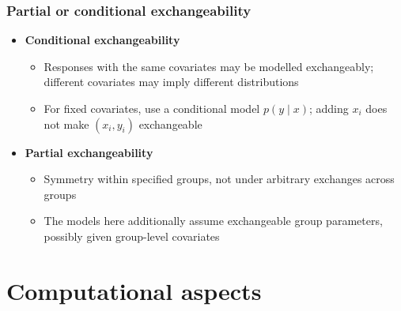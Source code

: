 \documentclass[10pt]{beamer}
\begin{document}
\begin{frame}

\frametitle{Partial or conditional exchangeability}

\begin{itemize}
  \item \textbf{Conditional exchangeability}
    \begin{itemize}
    \item Responses with the same covariates may be modelled
      exchangeably; different covariates may imply different distributions
    \item For fixed covariates, use a conditional model
      $p(y\mid x)$; adding $x_i$ does not make
      $(x_i,y_i)$ exchangeable
    \end{itemize}
  \item<2-> \textbf{Partial exchangeability}
    \begin{itemize}
    \item Symmetry within specified groups, not under arbitrary
      exchanges across groups
    \item The models here additionally assume exchangeable group
      parameters, possibly given group-level covariates
    \end{itemize}
\end{itemize}
\end{frame}






\section{Computational aspects}
\frame{\sectionpage}
\end{document}
